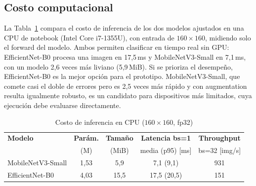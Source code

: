 \subsection{Costo computacional}
\label{subsec:res_costo}
La Tabla~\ref{tab:costo} compara el costo de inferencia de los dos modelos ajustados en una
CPU de notebook (Intel Core i7-1355U), con entrada de $160\times160$, midiendo solo el
forward del modelo. Ambos permiten
clasificar en tiempo real sin GPU: EfficientNet-B0 procesa una imagen en 17,5\,ms y
MobileNetV3-Small en 7,1\,ms, con un modelo 2,6 veces más liviano (5,9\,MiB). Si se prioriza
el desempeño, EfficientNet-B0 es la mejor opción para el prototipo. MobileNetV3-Small, que
comete casi el doble de errores pero es 2,5 veces más rápido y con augmentation resulta
igualmente robusto, es un candidato para dispositivos más limitados, cuya ejecución debe evaluarse directamente.

\begin{table}[t]
\centering
\caption{Costo de inferencia en CPU ($160\times160$, fp32)}
\label{tab:costo}
\setlength{\tabcolsep}{3pt}
\begin{tabular}{@{}lcccc@{}}
\toprule
\textbf{Modelo} & \textbf{Parám.} & \textbf{Tamaño} & \textbf{Latencia bs=1} & \textbf{Throughput} \\
 & (M) & (MiB) & media (p95) [ms] & bs=32 [img/s] \\
\midrule
MobileNetV3-Small & 1,53 & 5,9  & 7,1 (9,1)   & 931 \\
EfficientNet-B0   & 4,03 & 15,5 & 17,5 (20,5) & 151 \\
\bottomrule
\end{tabular}
\end{table}
